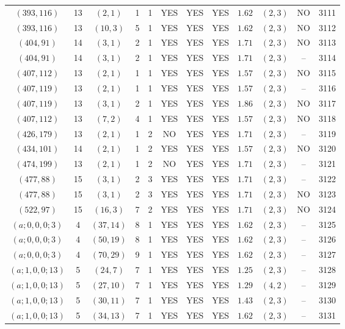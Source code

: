 \begin{longtable}{|c|c|c|c|c|c|c|c|c|c|c|c|}
$(393,116)$ & 13 & $(2,1)$ & 1 & 1 & YES & YES & YES & $1.62$ & $(2,3)$ & NO & 3111\\
$(393,116)$ & 13 & $(10,3)$ & 5 & 1 & YES & YES & YES & $1.62$ & $(2,3)$ & NO & 3112\\
$(404,91)$ & 14 & $(3,1)$ & 2 & 1 & YES & YES & YES & $1.71$ & $(2,3)$ & NO & 3113\\
$(404,91)$ & 14 & $(3,1)$ & 2 & 1 & YES & YES & YES & $1.71$ & $(2,3)$ & -- & 3114\\
$(407,112)$ & 13 & $(2,1)$ & 1 & 1 & YES & YES & YES & $1.57$ & $(2,3)$ & NO & 3115\\
$(407,119)$ & 13 & $(2,1)$ & 1 & 1 & YES & YES & YES & $1.57$ & $(2,3)$ & -- & 3116\\
$(407,119)$ & 13 & $(3,1)$ & 2 & 1 & YES & YES & YES & $1.86$ & $(2,3)$ & NO & 3117\\
$(407,112)$ & 13 & $(7,2)$ & 4 & 1 & YES & YES & YES & $1.57$ & $(2,3)$ & NO & 3118\\
$(426,179)$ & 13 & $(2,1)$ & 1 & 2 & NO & YES & YES & $1.71$ & $(2,3)$ & -- & 3119\\
$(434,101)$ & 14 & $(2,1)$ & 1 & 2 & YES & YES & YES & $1.57$ & $(2,3)$ & NO & 3120\\
$(474,199)$ & 13 & $(2,1)$ & 1 & 2 & NO & YES & YES & $1.71$ & $(2,3)$ & -- & 3121\\
$(477,88)$ & 15 & $(3,1)$ & 2 & 3 & YES & YES & YES & $1.71$ & $(2,3)$ & -- & 3122\\
$(477,88)$ & 15 & $(3,1)$ & 2 & 3 & YES & YES & YES & $1.71$ & $(2,3)$ & NO & 3123\\
$(522,97)$ & 15 & $(16,3)$ & 7 & 2 & YES & YES & YES & $1.71$ & $(2,3)$ & NO & 3124\\
$(a;0,0,0;3)$ & 4 & $(37,14)$ & 8 & 1 & YES & YES & YES & $1.62$ & $(2,3)$ & -- & 3125\\
$(a;0,0,0;3)$ & 4 & $(50,19)$ & 8 & 1 & YES & YES & YES & $1.62$ & $(2,3)$ & -- & 3126\\
$(a;0,0,0;3)$ & 4 & $(70,29)$ & 9 & 1 & YES & YES & YES & $1.62$ & $(2,3)$ & -- & 3127\\
$(a;1,0,0;13)$ & 5 & $(24,7)$ & 7 & 1 & YES & YES & YES & $1.25$ & $(2,3)$ & -- & 3128\\
$(a;1,0,0;13)$ & 5 & $(27,10)$ & 7 & 1 & YES & YES & YES & $1.29$ & $(4,2)$ & -- & 3129\\
$(a;1,0,0;13)$ & 5 & $(30,11)$ & 7 & 1 & YES & YES & YES & $1.43$ & $(2,3)$ & -- & 3130\\
$(a;1,0,0;13)$ & 5 & $(34,13)$ & 7 & 1 & YES & YES & YES & $1.62$ & $(2,3)$ & -- & 3131\\

\end{longtable}
